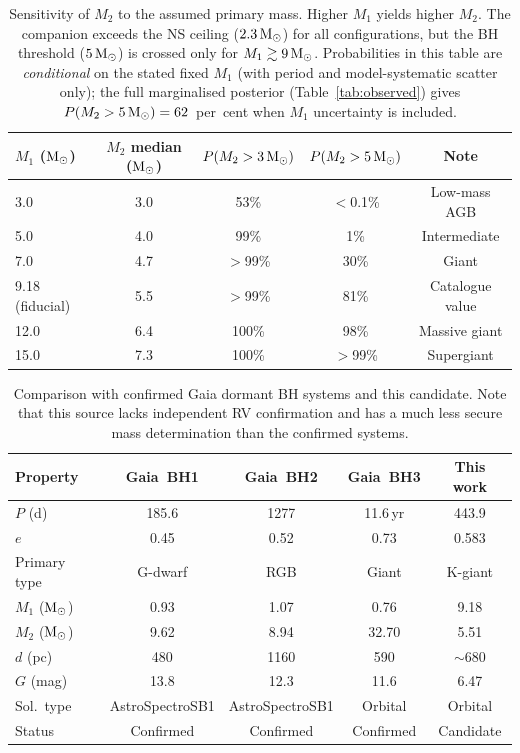 \documentclass[usenatbib,fleqn]{mnras}
\newcommand{\Msun}{{\rm M}_\odot}
\begin{document}
\begin{table}
\centering
\caption{Sensitivity of $M_2$ to the assumed primary mass.  Higher
$M_1$ yields higher $M_2$.  The companion exceeds the NS ceiling
($2.3\,\Msun$) for all configurations, but the BH threshold
($5\,\Msun$) is crossed only for $M_1 \gtrsim 9\,\Msun$.
Probabilities in this table are \emph{conditional} on the stated
fixed $M_1$ (with period and model-systematic scatter only);
the full marginalised posterior (Table~\ref{tab:observed})
gives $P(M_2 > 5\,\Msun) = 62$~per~cent when $M_1$ uncertainty
is included.}
\label{tab:sensitivity}
\begin{tabular}{lcccc}
\toprule
$M_1$ ($\Msun$) & $M_2$ median ($\Msun$) & $P(M_2 > 3\,\Msun)$ & $P(M_2 > 5\,\Msun)$ & Note \\
\midrule
3.0              & 3.0  & 53\%     & $<$0.1\% & Low-mass AGB \\
5.0              & 4.0  & 99\%     & 1\%      & Intermediate \\
7.0              & 4.7  & $>$99\%  & 30\%     & Giant \\
9.18 (fiducial)  & 5.5  & $>$99\%  & 81\%     & Catalogue value \\
12.0             & 6.4  & 100\%    & 98\%     & Massive giant \\
15.0             & 7.3  & 100\%    & $>$99\%  & Supergiant \\
\bottomrule
\end{tabular}
\end{table}

\begin{table}
\centering
\caption{Comparison with confirmed Gaia dormant BH systems and this
candidate.  Note that this source lacks independent RV
confirmation and has a much less secure mass determination
than the confirmed systems.}
\label{tab:comparison}
\begin{tabular}{lcccc}
\toprule
Property & Gaia~BH1 & Gaia~BH2 & Gaia~BH3 & This work \\
\midrule
$P$ (d)             & 185.6   & 1277    & 11.6\,yr & 443.9   \\
$e$                 & 0.45    & 0.52    & 0.73     & 0.583   \\
Primary type        & G-dwarf & RGB     & Giant    & K-giant \\
$M_1$ ($\Msun$)     & 0.93    & 1.07    & 0.76     & 9.18    \\
$M_2$ ($\Msun$)     & 9.62    & 8.94    & 32.70    & 5.51    \\
$d$ (pc)            & 480     & 1160    & 590      & $\sim$680 \\
$G$ (mag)           & 13.8    & 12.3    & 11.6     & 6.47    \\
Sol.\ type          & AstroSpectroSB1 & AstroSpectroSB1 & Orbital & Orbital \\
Status              & Confirmed & Confirmed & Confirmed & Candidate \\
\bottomrule
\end{tabular}
\end{table}
\end{document}
